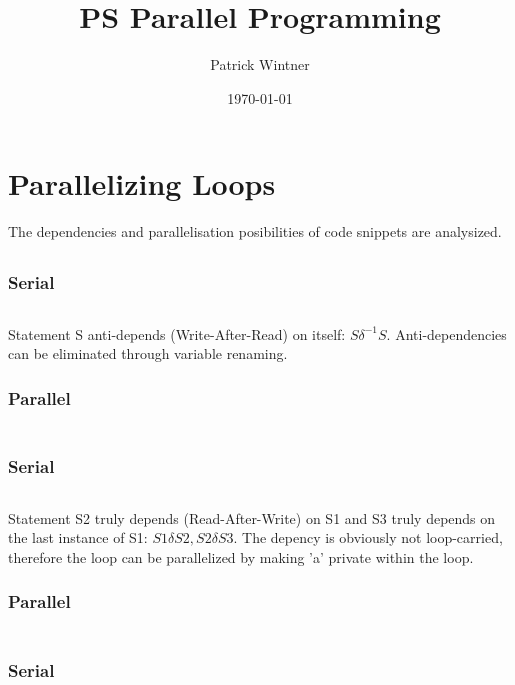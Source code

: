 \documentclass[parskip]{scrartcl}
\title{PS Parallel Programming}
\author{Patrick Wintner}
\date{\today}
\begin{document}
	\maketitle
	
	\section{Parallelizing Loops}
	The dependencies and parallelisation posibilities of code snippets are analysized.
	\subsection{}
	\subsubsection{Serial}
	\inputminted	[linenos]{c}{ex1/a_ser.c}
	
	Statement S anti-depends (Write-After-Read) on itself: $S\delta^{-1} S$. Anti-dependencies can be eliminated through variable renaming.
	\subsubsection{Parallel}
	\inputminted	[linenos]{c}{ex1/a_par.c}
	\subsection{}
	\subsubsection{Serial}
	\inputminted	[linenos]{c}{ex1/b_ser.c}
	
	Statement S2 truly depends (Read-After-Write) on S1 and S3 truly depends on the last instance of S1: $S1\delta S2, S2\delta S3$. The depency is obviously not loop-carried, therefore the loop can be parallelized by making 'a' private within the loop.
	\subsubsection{Parallel}
	\inputminted	[linenos]{c}{ex1/b_par.c}
	\subsection{}
	\subsubsection{Serial}
	\inputminted	[linenos]{c}{ex1/c_ser.c}
	
\end{document}
